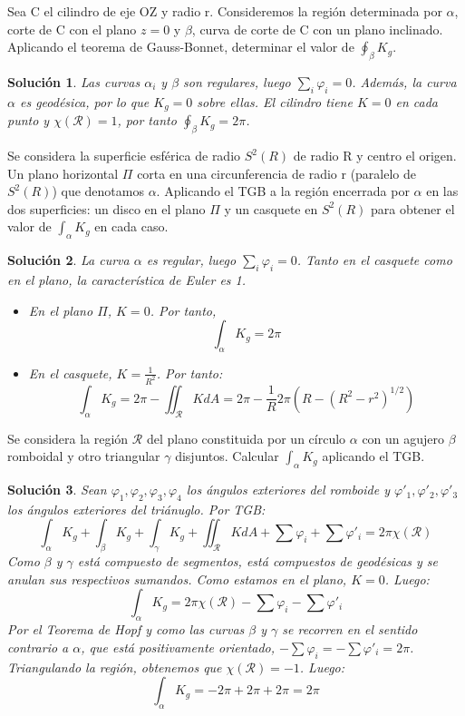 \documentclass[twoside]{report}
\theoremstyle{plain}
\newtheorem*{sol*}{Solución}
\newcommand{\X}{\chi}
\newenvironment{ejercicio}[2][Estado]{\begin{trivlist}
\item[\hskip \labelsep {\bfseries Ejercicio}\hskip \labelsep {\bfseries #2.}]}{\end{trivlist}}
\begin{document}
\newpage
\begin{ejercicio}{13} Sea C el cilindro de eje OZ y radio r. Consideremos la región determinada por $\alpha$, corte de C con el plano $z=0$ y $\beta$, curva de corte de C con un plano inclinado. Aplicando el teorema de Gauss-Bonnet, determinar el valor de $\oint_\beta K_g$.
\end{ejercicio}
\begin{sol*}
Las curvas $\alpha_i$ y $\beta$ son regulares, luego $\sum_i \varphi_i =0$. Además, la curva $\alpha$ es geodésica, por lo que $K_g=0$ sobre ellas. El cilindro tiene $K=0$ en cada punto y $\chi(\mathcal{R})=1$, por tanto $\oint_\beta K_g = 2\pi$.
\end{sol*}
\newpage
\begin{ejercicio}{14} Se considera la superficie esférica de radio $S^2(R)$ de radio R y centro el origen. Un plano horizontal $\Pi$ corta en una circunferencia de radio r (paralelo de $S^2(R)$) que denotamos $\alpha$. Aplicando el TGB a la región encerrada por $\alpha$ en las dos superficies: un disco en el plano $\Pi$ y un casquete en $S^2(R)$ para obtener el valor de $\int_\alpha K_g$ en cada caso.
\end{ejercicio}
\begin{sol*}
La curva $\alpha$ es regular, luego $\sum_i \varphi_i =0$. Tanto en el casquete como en el plano, la característica de Euler es 1. 
\begin{itemize}
\item En el plano $\Pi$, $K=0$. Por tanto, 
\[
\int_\alpha K_g = 2\pi
\]
\item En el casquete, $K=\frac{1}{R^2}$. Por tanto:
\[
\int_\alpha K_g = 2\pi - \iint_{\mathcal{R}}K dA = 2\pi - \frac{1}{R} 2\pi(R - (R^2-r^2)^{1/2})
\]
\end{itemize}
\end{sol*}
\newpage
\begin{ejercicio}{20}
Se considera la región $\mathcal{R}$ del plano constituida por un círculo $\alpha$ con un agujero $\beta$ romboidal y otro triangular $\gamma$ disjuntos. Calcular $\int_\alpha K_g$ aplicando el TGB.
\end{ejercicio}
\begin{sol*} Sean $\varphi_1,\varphi_2,\varphi_3,\varphi_4$ los ángulos exteriores del romboide y  $\varphi'_1,\varphi'_2,\varphi'_3$ los ángulos exteriores del triánuglo. Por TGB:
\[ \int_\alpha K_g + \int_\beta K_g + \int_\gamma K_g + \iint_\mathcal{R} K dA + \sum \varphi_i + \sum \varphi'_i = 2 \pi \X(\mathcal{R}) \]
Como $\beta$ y $\gamma$ está compuesto de segmentos, está compuestos de geodésicas y se anulan sus respectivos sumandos. Como estamos en el plano, $K = 0$. Luego:
\[ \int_\alpha K_g = 2 \pi \X(\mathcal{R}) - \sum \varphi_i - \sum \varphi'_i \]
Por el Teorema de Hopf y como las curvas $\beta$ y $\gamma$ se recorren en el sentido contrario a $\alpha$, que está positivamente orientado, $-\sum \varphi_i = -\sum \varphi'_i = 2\pi$. Triangulando la región, obtenemos que $\X(\mathcal{R})=-1$. Luego:
\[ \int_\alpha K_g = -2\pi+2\pi+2\pi = 2\pi \]
\end{sol*}
\end{document}
